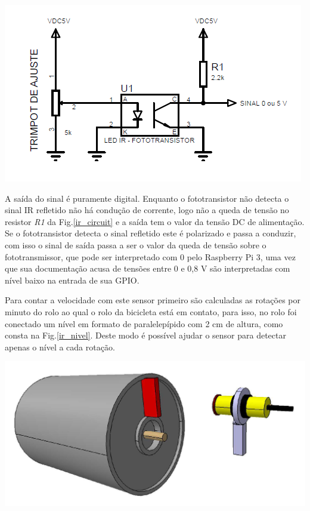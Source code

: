             \begin{center}
    	\includegraphics[scale=0.70]{figuras/IR_CIRCUIT.png}
        \label{ir_circuit}
    \end{center}

	A saída do sinal é puramente digital. Enquanto o fototransistor não detecta o sinal IR refletido não há condução de corrente, logo não a queda de tensão no resistor \textit{R1} da Fig.\ref{ir_circuit} e a saída tem o valor da tensão DC de alimentação. Se o fototransistor detecta o sinal refletido este é polarizado e passa a conduzir, com isso o sinal de saída passa a ser o valor da queda de tensão sobre o fototransmissor, que pode ser interpretado com 0 pelo Raspberry Pi 3, uma vez que sua documentação acusa de tensões entre 0 e 0,8 V são interpretadas com nível baixo na entrada de sua GPIO.
    
    	Para contar a velocidade com este sensor primeiro são calculadas as rotações por minuto do rolo ao qual o rolo da bicicleta está em contato, para isso, no rolo foi conectado um nível em formato de paralelepípido com 2 cm de altura, como consta na Fig.\ref{ir_nivel}. Deste modo é possível ajudar o sensor para detectar apenas o nível a cada rotação.
        
           \begin{center}
    	\includegraphics[scale=0.57]{figuras/ir_nivel.png}
        \label{ir_nivel}
    \end{center}        
    
